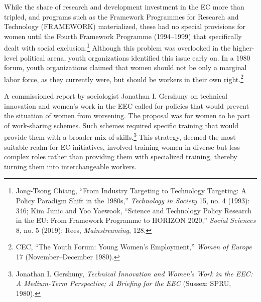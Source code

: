 \documentclass{tufte-handout}
\begin{document}
While the share of research and development investment in the EC more
than tripled, and programs such as the Framework Programmes for Research
and Technology (FRAMEWORK) materialized, these had no special provisions
for women until the Fourth Framework Programme (1994--1999) that
specifically dealt with social exclusion.\footnote{Jong-Tsong Chiang,
  ``From Industry Targeting to Technology Targeting: A Policy Paradigm
  Shift in the 1980s,'' \emph{Technology in Society} 15, no. 4 (1993):
  346; Kim Junic and Yoo Yaewook, ``Science and Technology Policy
  Research in the EU: From Framework Programme to HORIZON 2020,''
  \emph{Social Sciences} 8, no. 5 (2019); Rees, \emph{Mainstreaming},
  128.} Although this problem was overlooked in the higher-level
political arena, youth organizations identified this issue early on. In
a 1980 forum, youth organizations claimed that women should not be only
a marginal labor force, as they currently were, but should be workers in
their own right.\footnote{CEC, ``The Youth Forum: Young Women's
  Employment,'' \emph{Women of Europe} 17 (November--December 1980).}

A commissioned report by sociologist Jonathan I. Gershuny on technical
innovation and women's work in the EEC called for policies that would
prevent the situation of women from worsening. The proposal was for
women to be part of work-sharing schemes. Such schemes required specific
training that would provide them with a broader mix of
skills.\footnote{Jonathan I. Gershuny, \emph{Technical Innovation and
  Women's Work in the EEC: A Medium-Term Perspective; A Briefing for the
  EEC} (Sussex: SPRU, 1980).} This strategy, deemed the most suitable
realm for EC initiatives, involved training women in diverse but less
complex roles rather than providing them with specialized training,
thereby turning them into interchangeable workers.
\end{document}
